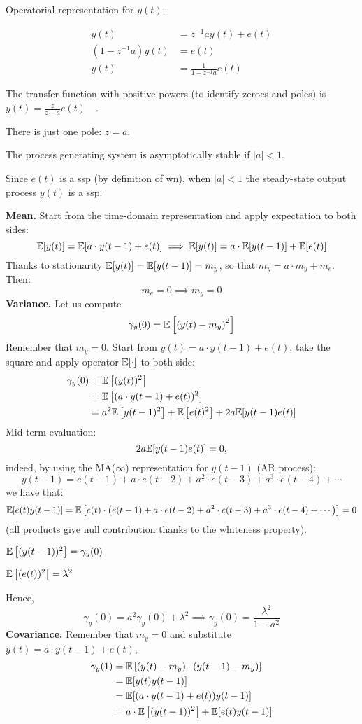 Operatorial representation for $y(t)$:

\begin{align*}
	y(t)&=z^{-1} a y(t)+e(t) \\
	\left(1-z^{-1} a\right) y(t)&=e(t) \\
	y(t)&=\frac{1}{1-z^{-1} a} e(t)
\end{align*}

The transfer function with positive powers (to identify zeroes and poles) is $y(t)=\frac{z}{z-a} e(t) \quad$.

There is just one pole: $z=a .$

The process generating system is asymptotically stable if $|a| <1$. 

Since $e(t)$ is a \gls{ssp} (by definition of \gls{wn}), when $|a| <1$ the steady-state output process $y(t)$ is a \gls{ssp}.

\textbf{Mean.}
Start from the time-domain representation and apply expectation to both sides:
\[
	\mathbb{E}[y(t)]=\mathbb{E}[a \cdot y(t-1)+e(t)] \implies \mathbb{E}[y(t)]=a \cdot \mathbb{E}[y(t-1)]+\mathbb{E}[e(t)]
\]
Thanks to stationarity $\mathbb{E}[y(t)]=\mathbb{E}[y(t-1)]=m_{y}$, so that $m_{y}=a \cdot m_{y}+m_{e}$.
Then:
$$
m_{e}=0 \implies  m_{y}=0
$$
\textbf{Variance.}
Let us compute
\[
	\gamma_{y}(0)=\mathbb{E}\left[\left(y(t)-m_{y}\right)^{2}\right]
\]
Remember that $m_{y}=0$. Start from $y(t)=a \cdot y(t-1)+e(t)$, take the square and apply operator $\mathbb{E}[\cdot]$ to both side:
\begin{align*}
	\gamma_{y}(0)&=\mathbb{E}\left[(y(t))^{2}\right]\\
	&=\mathbb{E}\left[(a \cdot y(t-1)+e(t))^{2}\right]\\
	&=a^{2} \mathbb{E}\left[y(t-1)^{2}\right]+\mathbb{E}\left[e(t)^{2}\right]+2 a \mathbb{E}[y(t-1) e(t)]\\
\end{align*}
Mid-term evaluation:
\[
	2 a \mathbb{E}[y(t-1) e(t)]=0,
\]
indeed, by using the MA($\infty$) representation for $y(t-1)$ (AR process):
$$
y(t-1)=e(t-1)+a \cdot e(t-2)+a^{2} \cdot e(t-3)+a^{3} \cdot e(t-4)+\cdots
$$
we have that:
\[
	\mathbb{E}[e(t) y(t-1)]=\mathbb{E}\left[e(t) \cdot\left(e(t-1)+a \cdot e(t-2)+a^{2} \cdot e(t-3)+a^{3} \cdot e(t-4)+\cdots\right)\right]=0
\]
(all products give null contribution thanks to the whiteness property).


$\mathbb{E}\left[(y(t-1))^{2}\right]=\gamma_{y}(0)$

$\mathbb{E}\left[(e(t))^{2}\right]=\lambda^{2}$

Hence,
\[
	\gamma_{y}(0)=a^{2} \gamma_{y}(0)+\lambda^{2} \implies \gamma_{y}(0)=\frac{\lambda^{2}}{1-a^{2}}
\]
\textbf{Covariance.}
Remember that $m_{y}=0$ and substitute $y(t)=a \cdot y(t-1)+e(t)$,
\begin{align*}
	\gamma_{y}(1)&=\mathbb{E}\left[\left(y(t)-m_{y}\right) \cdot\left(y(t-1)-m_{y}\right)\right]\\
	&=\mathbb{E}[y(t) y(t-1)]\\
	&=\mathbb{E}[(a \cdot y(t-1)+e(t))y(t-1)]\\
	&=a \cdot \mathbb{E}\left[(y(t-1))^{2}\right]+\mathbb{E}[e(t) y(t-1)]
\end{align*}

